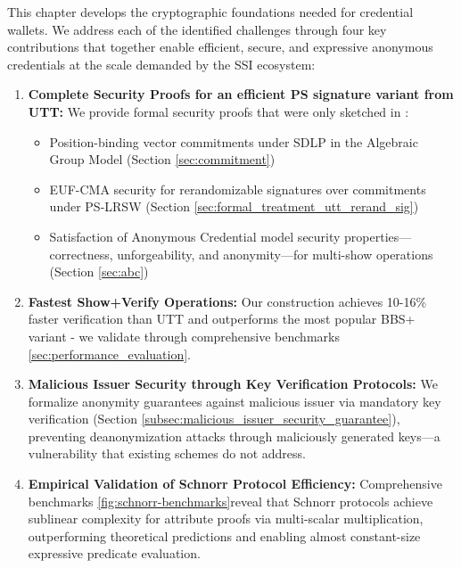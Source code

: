 This chapter develops the cryptographic foundations needed for credential wallets. We address each of the identified challenges through four key contributions that together enable efficient, secure, and expressive anonymous credentials at the scale demanded by the SSI ecosystem:

\begin{enumerate}
    \item \textbf{Complete Security Proofs for an efficient PS signature variant from UTT:} We provide formal security proofs that were only sketched in \cite{tomescu_utt_2022}:
    \begin{itemize}
        \item Position-binding vector commitments under SDLP in the Algebraic Group Model (Section \ref{sec:commitment})
        \item EUF-CMA security for rerandomizable signatures over commitments under PS-LRSW (Section \ref{sec:formal_treatment_utt_rerand_sig})
        \item Satisfaction of Anonymous Credential model \cite{fuchsbauer_structure-preserving_2019} security properties—correctness, unforgeability, and anonymity—for multi-show operations (Section \ref{sec:abc})
    \end{itemize}

    \item \textbf{Fastest Show+Verify Operations:} Our construction achieves 10-16\% faster verification than UTT \cite{tomescu_utt_2022} and outperforms the most popular BBS+ variant \cite{camenisch_anonymous_2016} - we validate through comprehensive benchmarks \ref{sec:performance_evaluation}.

    \item \textbf{Malicious Issuer Security through Key Verification Protocols:} We formalize anonymity guarantees against malicious issuer via mandatory key verification (Section \ref{subsec:malicious_issuer_security_guarantee}), preventing deanonymization attacks through maliciously generated keys—a vulnerability that existing schemes do not address.

    \item \textbf{Empirical Validation of Schnorr Protocol Efficiency:} Comprehensive benchmarks \ref{fig:schnorr-benchmarks}reveal that Schnorr protocols achieve sublinear complexity for attribute proofs via multi-scalar multiplication, outperforming theoretical predictions and enabling almost constant-size expressive predicate evaluation.
\end{enumerate}

